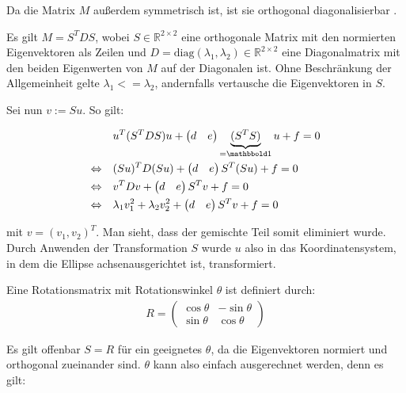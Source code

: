 Da die Matrix $M$ außerdem symmetrisch ist, ist sie orthogonal diagonalisierbar \cite[S. 278]{Bosch2006}.

Es gilt $M = S^TDS$, wobei $S\in\mathbb{R}^{2\times2}$ eine orthogonale Matrix mit den normierten Eigenvektoren als Zeilen und $D = \text{diag}(\lambda_1, \lambda_2)\in\mathbb{R}^{2\times2}$ eine Diagonalmatrix mit den beiden Eigenwerten von $M$ auf der Diagonalen ist. Ohne Beschränkung der Allgemeinheit gelte $\lambda_1 <= \lambda_2$, andernfalls vertausche die Eigenvektoren in $S$. 

Sei nun $v := Su$.
So gilt:

\begin{equation} \label{eq:PCARot}
\begin{aligned}
&u^T(S^TDS)u +\begin{pmatrix}d & e\end{pmatrix}\underbrace{(S^TS)}_{=\ind}u + f = 0 \\
\Leftrightarrow\quad &(Su)^TD(Su) +\begin{pmatrix}d & e\end{pmatrix}S^T(Su) + f = 0 \\
\Leftrightarrow\quad &v^{T}Dv +\begin{pmatrix}d & e\end{pmatrix}S^Tv + f = 0 \\
\Leftrightarrow\quad &\lambda_1v_1^2 + \lambda_2v_2^2 +\begin{pmatrix}d & e\end{pmatrix}S^Tv + f = 0 
\end{aligned}
\end{equation}

mit $v = (v_1,v_2)^T$. Man sieht, dass der gemischte Teil somit eliminiert wurde. Durch Anwenden der Transformation $S$ wurde $u$ also in das Koordinatensystem, in dem die Ellipse achsenausgerichtet ist,  transformiert.

Eine Rotationsmatrix mit Rotationswinkel $\theta$ ist definiert durch: 
\begin{equation}
\begin{aligned}
R = \begin{pmatrix}\cos\theta & -\sin\theta \\ \sin\theta & \cos\theta\end{pmatrix}
\end{aligned}
\end{equation}

Es gilt offenbar $S = R$ für ein geeignetes $\theta$, da die Eigenvektoren normiert und orthogonal zueinander sind. $\theta$ kann also einfach ausgerechnet werden, denn es gilt:

